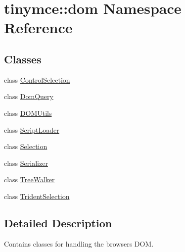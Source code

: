 \hypertarget{namespacetinymce_1_1dom}{\section{tinymce\+:\+:dom Namespace Reference}
\label{namespacetinymce_1_1dom}
}
\subsection*{Classes}
\begin{DoxyCompactItemize}
\item 
class \hyperlink{classtinymce_1_1dom_1_1_control_selection}{Control\+Selection}
\item 
class \hyperlink{classtinymce_1_1dom_1_1_dom_query}{Dom\+Query}
\item 
class \hyperlink{classtinymce_1_1dom_1_1_d_o_m_utils}{D\+O\+M\+Utils}
\item 
class \hyperlink{classtinymce_1_1dom_1_1_script_loader}{Script\+Loader}
\item 
class \hyperlink{classtinymce_1_1dom_1_1_selection}{Selection}
\item 
class \hyperlink{classtinymce_1_1dom_1_1_serializer}{Serializer}
\item 
class \hyperlink{classtinymce_1_1dom_1_1_tree_walker}{Tree\+Walker}
\item 
class \hyperlink{classtinymce_1_1dom_1_1_trident_selection}{Trident\+Selection}
\end{DoxyCompactItemize}


\subsection{Detailed Description}
Contains classes for handling the browsers D\+O\+M. 